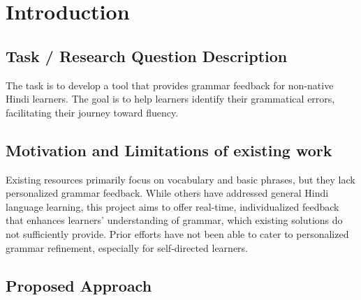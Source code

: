 \documentclass[11pt,a4paper]{article}
\begin{document}
\section{Introduction}

\subsection{Task / Research Question Description}

The task is to develop a tool that provides 
grammar feedback for non-native Hindi learners. The goal is to help learners identify 
their grammatical errors, facilitating their journey toward fluency.

\subsection{ Motivation and Limitations of existing work}

Existing resources primarily focus on vocabulary and basic phrases, but they lack personalized grammar feedback. While others have addressed general Hindi language learning, this project aims to offer real-time, individualized feedback that enhances learners' understanding of grammar, which existing solutions do not sufficiently provide. Prior efforts have not been able to cater to personalized grammar refinement, especially for self-directed learners.

\subsection{Proposed Approach}
\end{document}
